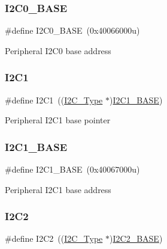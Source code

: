 \subsubsection{\texorpdfstring{I2\+C0\+\_\+\+B\+A\+SE}{I2C0\_BASE}}
{\footnotesize\ttfamily \#define I2\+C0\+\_\+\+B\+A\+SE~(0x40066000u)}

Peripheral I2\+C0 base address \mbox{\label{group___i2_c___register___masks_gab45d257574da6fe1f091cc45b7eda6cc}} 
\subsubsection{\texorpdfstring{I2\+C1}{I2C1}}
{\footnotesize\ttfamily \#define I2\+C1~((\mbox{\hyperlink{struct_i2_c___type}{I2\+C\+\_\+\+Type}} $\ast$)\mbox{\hyperlink{group___i2_c___register___masks_gacd72dbffb1738ca87c838545c4eb85a3}{I2\+C1\+\_\+\+B\+A\+SE}})}

Peripheral I2\+C1 base pointer \mbox{\label{group___i2_c___register___masks_gacd72dbffb1738ca87c838545c4eb85a3}} 
\subsubsection{\texorpdfstring{I2\+C1\+\_\+\+B\+A\+SE}{I2C1\_BASE}}
{\footnotesize\ttfamily \#define I2\+C1\+\_\+\+B\+A\+SE~(0x40067000u)}

Peripheral I2\+C1 base address \mbox{\label{group___i2_c___register___masks_gafa60ac20c1921ef1002083bb3e1f5d16}} 
\subsubsection{\texorpdfstring{I2\+C2}{I2C2}}
{\footnotesize\ttfamily \#define I2\+C2~((\mbox{\hyperlink{struct_i2_c___type}{I2\+C\+\_\+\+Type}} $\ast$)\mbox{\hyperlink{group___i2_c___register___masks_ga04bda70f25c795fb79f163b633ad4a5d}{I2\+C2\+\_\+\+B\+A\+SE}})}

